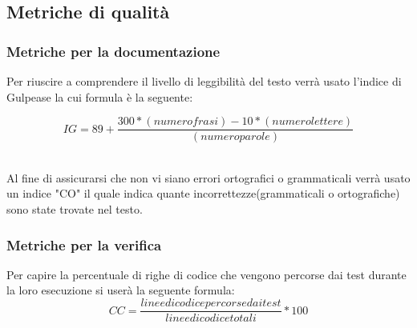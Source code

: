 \subsection{Metriche di qualità}
\subsubsection{Metriche per la documentazione}
Per riuscire a comprendere il livello di leggibilità del testo verrà usato l'indice di Gulpease la cui formula è la seguente:
\begin{center}
\[IG=89+\frac{300*(numero frasi)-10*(numero lettere)}{(numero parole)}\]\\
\end{center}

Al fine di assicurarsi che non vi siano errori ortografici o grammaticali verrà usato un indice "CO" il quale indica quante incorrettezze(grammaticali o ortografiche) sono state trovate nel testo.

\subsubsection{Metriche per la verifica}
Per capire la percentuale di righe di codice che vengono percorse dai test durante la loro esecuzione si userà la seguente formula:
\[CC=\frac{linee di codice percorse dai test}{linee di codice totali}*100\]\\

 